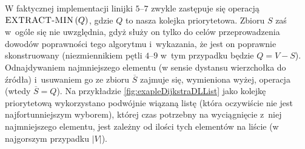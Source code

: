 W faktycznej implementacji linijki $5$--$7$ zwykle zastępuje się operacją $\textrm{\textsc{EXTRACT-MIN}} \left( Q \right)$, gdzie $Q$ to nasza kolejka priorytetowa. Zbioru $S$ zaś w~ogóle się nie uwzględnia, gdyż służy on tylko do celów przeprowadzenia dowodów poprawności tego algorytmu i~wykazania, że jest on poprawnie skonstruowany (niezmiennikiem pętli $4$--$9$ w~tym przypadku będzie $Q = V - S$). Odnajdywaniem najmniejszego elementu (w sensie dystansu wierzchołka do źródła) i~usuwaniem go ze zbioru $\overline{S}$ zajmuje się, wymieniona wyżej, operacja (wtedy $\overline{S} = Q$). Na przykładzie \ref{fig:exapleDijkstraDLList} jako kolejkę priorytetową wykorzystano podwójnie wiązaną listę (która oczywiście nie jest najfortunniejszym wyborem), której czas potrzebny na wyciągnięcie z~niej najmniejszego elementu, jest zależny od ilości tych elementów na liście (w najgorszym przypadku $ \left| V \right| $).

